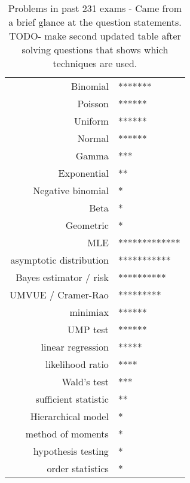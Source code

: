 \documentclass[10pt, twocolumn]{article}
\begin{document}
\begin{table}[]
    \centering
    \caption{Problems in past 231 exams - Came from a brief glance at the
    question statements. TODO- make second updated table after solving
    questions that shows which techniques are used.}
    \label{231problems}
    \begin{tabular}{rl}

        Binomial                & ******* \\
        Poisson                 & ****** \\
        Uniform                 & ****** \\
        Normal                  & ****** \\
        Gamma                   & *** \\
        Exponential             & ** \\
        Negative binomial       & * \\
        Beta                    & * \\
        Geometric               & * \\
        MLE                     & ************* \\
        asymptotic distribution & *********** \\
        Bayes estimator / risk  & ********** \\
        UMVUE / Cramer-Rao      & ********* \\
        minimiax                & ****** \\
        UMP test                & ****** \\
        linear regression       & ***** \\
        likelihood ratio        & **** \\
        Wald's test             & *** \\
        sufficient statistic    & ** \\
        Hierarchical model      & * \\
        method of moments       & * \\
        hypothesis testing      & * \\
        order statistics        & * \\

    \end{tabular}
\end{table}
\end{document}
